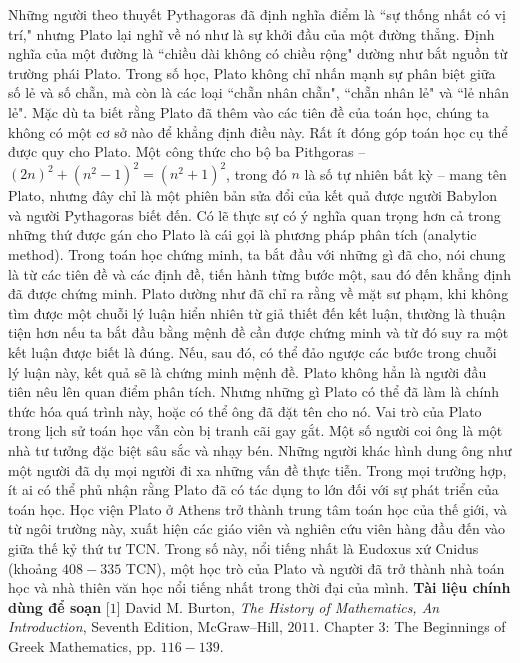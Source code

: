 \begin{multicols}{2}
	\vskip 0.1cm
	Những người theo thuyết Pythagoras đã định nghĩa điểm là ``sự thống nhất có vị trí," nhưng Plato lại nghĩ về nó như là sự khởi đầu của một đường thẳng.
	\vskip 0.1cm 
	Định nghĩa của một đường là ``chiều dài không có chiều rộng" dường như bắt nguồn từ trường phái Plato.
	\vskip 0.1cm
	Trong số học, Plato không chỉ nhấn mạnh sự phân biệt giữa số lẻ và số chẵn, mà còn là các loại ``chẵn nhân chẵn", ``chẵn nhân lẻ" và ``lẻ nhân lẻ". Mặc dù ta biết rằng Plato đã thêm vào các tiên đề của toán học, chúng ta không có một cơ sở nào để khẳng định điều này.
	\vskip 0.1cm
	Rất ít đóng góp toán học cụ thể được quy cho Plato. Một công thức cho bộ ba Pithgoras -- ${(2n)^2} + {({n^2} - 1)^2} = {({n^2} + 1)^2}$, trong đó  $n$ là số tự nhiên bất kỳ -- mang tên Plato, nhưng đây chỉ là một phiên bản sửa đổi của kết quả được người Babylon và người Pythagoras biết đến. 
	\vskip 0.1cm
	Có lẽ thực sự có ý nghĩa quan trọng hơn cả trong những thứ được gán cho Plato là cái gọi là phương pháp phân tích (analytic method).
	\vskip 0.1cm
	Trong toán học chứng minh, ta bắt đầu với những gì đã cho, nói chung là từ các tiên đề và các định đề, tiến hành từng bước một, sau đó đến khẳng định đã được chứng minh. 
	\vskip 0.1cm
	Plato dường như đã chỉ ra rằng  về mặt sư phạm, khi không tìm được một chuỗi lý luận hiển nhiên từ giả thiết đến kết luận, thường là thuận tiện hơn nếu ta bắt đầu bằng mệnh đề cần được chứng minh và từ đó suy ra một kết luận được biết là đúng. Nếu, sau đó, có thể đảo ngược các bước trong chuỗi lý luận này, kết quả sẽ là chứng minh mệnh đề. 
	\vskip 0.1cm
	Plato không hẳn là người đầu tiên nêu lên quan điểm phân tích.  Nhưng những gì Plato có thể đã làm là chính thức hóa quá trình này, hoặc có thể ông đã đặt tên cho nó.
	\vskip 0.1cm
	Vai trò của Plato trong lịch sử toán học vẫn còn bị tranh cãi gay gắt. Một số người coi ông là một nhà tư tưởng đặc biệt sâu sắc và nhạy bén. Những người khác hình dung ông như một người đã dụ mọi người đi xa những vấn đề thực tiễn. 
	\vskip 0.1cm
	Trong mọi trường hợp, ít ai có thể phủ nhận rằng Plato đã có tác dụng to lớn đối với sự phát triển của toán học. Học viện Plato ở Athens trở thành trung tâm toán học của thế giới, và từ ngôi trường này, xuất hiện các giáo viên và nghiên cứu viên hàng đầu đến vào giữa thế kỷ thứ tư TCN. Trong số này, nổi tiếng nhất là Eudoxus xứ Cnidus (khoảng $408-335$ TCN),  một học trò của Plato và người đã trở thành nhà toán học và nhà thiên văn học nổi tiếng nhất trong thời đại của mình.
	\vskip 0.1cm
	\textbf{\color{lichsutoanhoc}Tài liệu chính dùng để soạn}
	\vskip 0.1cm
	[$1$] David M. Burton, \textit{The History of Mathematics, An Introduction}, Seventh Edition, McGraw--Hill, $2011$. Chapter $3$: The Beginnings of Greek Mathematics, pp. $116-139$.

\end{multicols}
